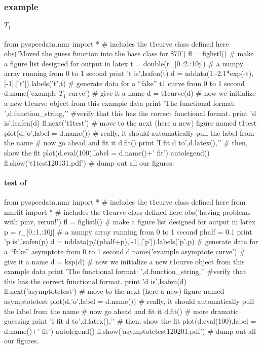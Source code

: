 \subsubsection{example}\label{sec:writeup_software_fitfunc_thingstouse_example}

\paragraph{$T_1$}
\begin{python}
from pyspecdata.nmr import * # includes the t1curve class defined here
obs('Moved the guess function into the base class for 870')
fl = figlistl() # make a figure list designed for output in latex
t = double(r_[0.:2.:10j]) # a numpy array running from 0 to 1 second
print 't is',lsafen(t)
d = nddata(1.-2.1*exp(-t),[-1],['t']).labels('t',t) # generate data for a ``fake'' t1 curve from 0 to 1 second
d.name('example $T_1$ curve') # give it a name
d = t1curve(d) # now we initialize a new t1curve object from this example data
print 'The functional format: ',d.function_string,'\n\n' #verify that this has the correct functional format.
print 'd is',lsafen(d)
fl.next('t1test') # move to the next (here a new) figure named t1test
plot(d,'o',label = d.name()) # really, it should automatically pull the label from the name
# now go ahead and fit it
d.fit()
print 'I fit d to',d.latex(),'\n\n'
# then, show the fit
plot(d.eval(100),label = d.name()+' fit')
autolegend()
fl.show('t1test120131.pdf') # dump out all our figures.
\end{python}
\paragraph{test of \ksp}\label{sec:random_testofksp}

\begin{python}
from pyspecdata.nmr import * # includes the t1curve class defined here
from nmrfit import * # includes the t1curve class defined here
obs('having problems with pinv, rerun!')
fl = figlistl() # make a figure list designed for output in latex
p = r_[0.:1.:10j] # a numpy array running from 0 to 1 second
phalf = 0.1
print 'p is',lsafen(p)
d = nddata(p/(phalf+p),[-1],['p']).labels('p',p) # generate data for a ``fake'' asymptote from 0 to 1 second
d.name('example asymptote curve') # give it a name
d = ksp(d) # now we initialize a new t1curve object from this example data
print 'The functional format: ',d.function_string,'\n\n' #verify that this has the correct functional format.
print 'd is',lsafen(d)
fl.next('asymptotetest') # move to the next (here a new) figure named asymptotetest
plot(d,'o',label = d.name()) # really, it should automatically pull the label from the name
# now go ahead and fit it
d.fit() # more dramatic guessing
print 'I fit d to',d.latex(),'\n\n'
# then, show the fit
plot(d.eval(100),label = d.name()+' fit')
autolegend()
fl.show('asymptotetest120201.pdf') # dump out all our figures.
\end{python}
